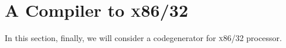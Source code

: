 \chapter{A Compiler to \textsc{x86/32}}

In this section, finally, we will consider a codegenerator for \textsc{x86/32} processor. 
